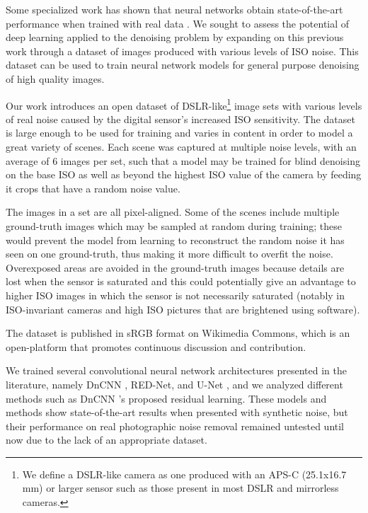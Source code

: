 Some specialized work has shown that neural networks obtain state-of-the-art performance when trained with real data \cite{learningtoseeinthedark}\cite{microscopynoise}. We sought to assess the potential of deep learning applied to the denoising problem by expanding on this previous work through a dataset of images produced with various levels of ISO noise. This dataset can be used to train neural network models for general purpose denoising of high quality images.

Our work introduces an open dataset of DSLR-like\footnote{\label{largesensornote}We define a DSLR-like camera as one produced with an APS-C (25.1x16.7 mm) or larger sensor such as those present in most DSLR and mirrorless cameras.} image sets with various levels of real noise caused by the digital sensor's increased ISO sensitivity. The dataset is large enough to be used for training and varies in content in order to model a great variety of scenes. Each scene was captured at multiple noise levels, with an average of 6 images per set, such that a model may be trained for blind denoising on the base ISO as well as beyond the highest ISO value of the camera by feeding it crops that have a random noise value.

The images in a set are all pixel-aligned. Some of the scenes include multiple ground-truth images which may be sampled at random during training; these would prevent the model from learning to reconstruct the random noise it has seen on one ground-truth, thus making it more difficult to overfit the noise. Overexposed areas are avoided in the ground-truth images because details are lost when the sensor is saturated and this could potentially give an advantage to higher ISO images in which the sensor is not necessarily saturated (notably in ISO-invariant cameras and high ISO pictures that are brightened using software).

The dataset is published in sRGB format on Wikimedia Commons, which is an open-platform that promotes continuous discussion and contribution.


We trained several convolutional neural network architectures presented in the literature, namely DnCNN \cite{dncnn}, \ac{RED-Net}, and U-Net \cite{unet}, and we analyzed different methods such as DnCNN \cite{dncnn}'s proposed residual learning. These models and methods show state-of-the-art results when presented with synthetic noise, but their performance on real photographic noise removal remained untested until now due to the lack of an appropriate dataset.

